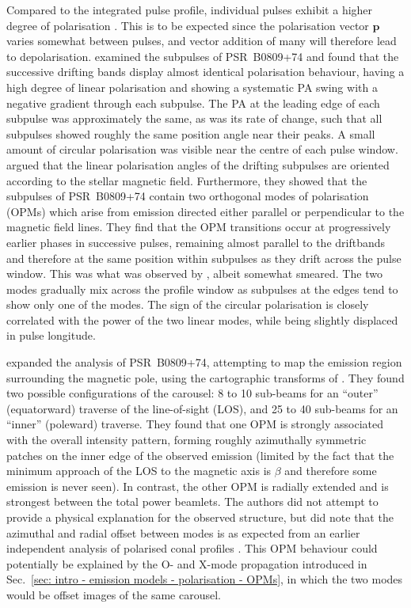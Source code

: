 Compared to the integrated pulse profile, individual pulses exhibit a higher degree of polarisation \citep[see][]{PulsarAstronomy}. This is to be expected since the polarisation vector $\mathbf{p}$ varies somewhat between pulses, and vector addition of many will therefore lead to depolarisation. \citet{THHM1971} examined the subpulses of PSR~B0809+74 and found that the successive drifting bands display almost identical polarisation behaviour, having a high degree of linear polarisation and showing a systematic PA swing with a negative gradient through each subpulse. The PA at the leading edge of each subpulse was approximately the same, as was its rate of change, such that all subpulses showed roughly the same position angle near their peaks. A small amount of circular polarisation was visible near the centre of each pulse window. \citet{RRS+2002} argued that the linear polarisation angles of the drifting subpulses are oriented according to the stellar magnetic field. Furthermore, they showed that the subpulses of PSR~B0809+74 contain two orthogonal modes of polarisation (OPMs) which arise from emission directed either parallel or perpendicular to the magnetic field lines. They find that the OPM transitions occur at progressively earlier phases in successive pulses, remaining almost parallel to the driftbands and therefore at the same position within subpulses as they drift across the pulse window. This was what was observed by \citet{THHM1971}, albeit somewhat smeared. The two modes gradually mix across the profile window as subpulses at the edges tend to show only one of the modes. The sign of the circular polarisation is closely correlated with the power of the two linear modes, while being slightly displaced in pulse longitude.

\citet{RRL+2006} expanded the analysis of PSR~B0809+74, attempting to map the emission region surrounding the magnetic pole, using the cartographic transforms of \citet[][see Appendix~\ref{app: geometry derivations}]{DRxx2001}. They found two possible configurations of the carousel: 8 to 10 sub-beams for an ``outer'' (equatorward) traverse of the line-of-sight (LOS), and 25 to 40 sub-beams for an ``inner'' (poleward) traverse. They found that one OPM is strongly associated with the overall intensity pattern, forming roughly azimuthally symmetric patches on the inner edge of the observed emission (limited by the fact that the minimum approach of the LOS to the magnetic axis is $\beta$ and therefore some emission is never seen). In contrast, the other OPM is radially extended and is strongest between the total power beamlets. The authors did not attempt to provide a physical explanation for the observed structure, but did note that the azimuthal and radial offset between modes is as expected from an earlier independent analysis of polarised conal profiles \citep{RRxx2003}. This OPM behaviour could potentially be explained by the O- and X-mode propagation introduced in Sec.~\ref{sec: intro - emission models - polarisation - OPMs}, in which the two modes would be offset images of the same carousel.



